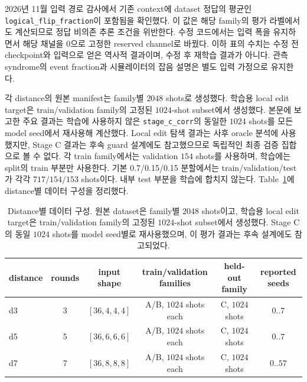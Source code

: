 \documentclass[aps,prd,12pt,twocolumn,superscriptaddress,floatfix,longbibliography]{revtex4-2}
\newcommand{\thesiscaptionfont}{\footnotesize}
\begin{document}
2026년 11월 입력 경로 감사에서 기존 context에 dataset 정답의 평균인
\texttt{logical\_flip\_fraction}이 포함됨을 확인했다. 이 값은 해당 family의
평가 라벨에서도 계산되므로 정답 비의존 추론 조건을 위반한다. 수정 코드에서는
입력 폭을 유지하면서 해당 채널을 0으로 고정한 reserved channel로 바꿨다.
이하 표의 수치는 수정 전 checkpoint와 입력으로 얻은 역사적 결과이며,
수정 후 재학습 결과가 아니다. 관측 syndrome의 event fraction과 시뮬레이터의
잡음 설명은 별도 입력 가정으로 유지한다.

각 distance의 원본 manifest는 family별 \(2048\) shots로 생성했다. 학습용 local edit
target은 train/validation family의 고정된 \(1024\)-shot subset에서 생성했다.
본문에 보고한 주요 결과는 학습에 사용하지 않은 \texttt{stage\_c\_corr}의
동일한 \(1024\) shots를 모든 model seed에서 재사용해 계산했다. Local edit 탐색
결과는 사후 oracle 분석에 사용했지만, Stage C 결과는 후속 guard 설계에도
참고했으므로 독립적인 최종 검증 집합으로 볼 수 없다. 각 train family에서는
validation \(154\) shots를 사용하며, 학습에는 split의 train 부분만 사용한다.
기본 0.7/0.15/0.15 분할에서는 train/validation/test가 각각
\(717/154/153\) shots이다. 내부 test 부분을 학습에 합치지 않는다.
Table~\ref{tab:dataset-config}에 distance별 데이터 구성을 정리했다.

\begin{table}[!tbp]
\caption{\thesiscaptionfont Distance별 데이터 구성. 원본 dataset은 family별 \(2048\) shots이고, 학습용
local edit target은 train/validation family의 고정된 \(1024\)-shot subset에서
생성했다. Stage C의 동일 \(1024\) shots를 model seed별로 재사용했으며,
이 평가 결과는 후속 설계에도 참고되었다.}
\label{tab:dataset-config}
\centering
\scriptsize
\begin{tabular*}{\textwidth}{@{\extracolsep{\fill}}lccccc}
\toprule
distance & rounds & input shape & train/validation families & held-out family & reported seeds \\
\midrule
d3 & 3 & \([36,4,4,4]\) & A/B, \(1024\) shots each & C, \(1024\) shots & \(0..7\) \\
d5 & 5 & \([36,6,6,6]\) & A/B, \(1024\) shots each & C, \(1024\) shots & \(0..7\) \\
d7 & 7 & \([36,8,8,8]\) & A/B, \(1024\) shots each & C, \(1024\) shots & \(0..57\) \\
\bottomrule
\end{tabular*}
\end{table}
\end{document}
